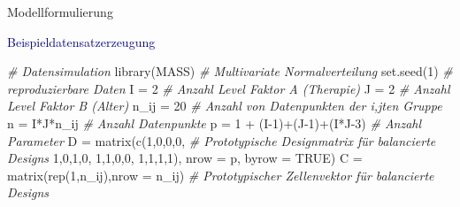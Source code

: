 \documentclass[
  8pt,
  ignorenonframetext,
]{beamer}
\newenvironment{Shaded}{\begin{snugshade}}{\end{snugshade}}
\newcommand{\AttributeTok}[1]{\textcolor[rgb]{0.77,0.63,0.00}{#1}}
\newcommand{\CommentTok}[1]{\textcolor[rgb]{0.56,0.35,0.01}{\textit{#1}}}
\newcommand{\ConstantTok}[1]{\textcolor[rgb]{0.00,0.00,0.00}{#1}}
\newcommand{\DecValTok}[1]{\textcolor[rgb]{0.00,0.00,0.81}{#1}}
\newcommand{\FunctionTok}[1]{\textcolor[rgb]{0.00,0.00,0.00}{#1}}
\newcommand{\NormalTok}[1]{#1}
\newcommand{\OtherTok}[1]{\textcolor[rgb]{0.56,0.35,0.01}{#1}}
\newcommand{\SpecialCharTok}[1]{\textcolor[rgb]{0.00,0.00,0.00}{#1}}
\begin{document}
\begin{frame}[fragile]{Modellformulierung}
\protect\hypertarget{modellformulierung-12}{}
\vspace{2mm}

\textcolor{darkblue}{Beispieldatensatzerzeugung} \vspace{1mm} \tiny
{}

\begin{Shaded}
\begin{Highlighting}[]
\CommentTok{\# Datensimulation}
\FunctionTok{library}\NormalTok{(MASS)                                            }\CommentTok{\# Multivariate Normalverteilung}
\FunctionTok{set.seed}\NormalTok{(}\DecValTok{1}\NormalTok{)                                              }\CommentTok{\# reproduzierbare Daten}
\NormalTok{I             }\OtherTok{=} \DecValTok{2}                                        \CommentTok{\# Anzahl Level Faktor A (Therapie)}
\NormalTok{J             }\OtherTok{=} \DecValTok{2}                                        \CommentTok{\# Anzahl Level Faktor B (Alter)}
\NormalTok{n\_ij          }\OtherTok{=} \DecValTok{20}                                       \CommentTok{\# Anzahl von Datenpunkten der i,jten Gruppe}
\NormalTok{n             }\OtherTok{=}\NormalTok{ I}\SpecialCharTok{*}\NormalTok{J}\SpecialCharTok{*}\NormalTok{n\_ij                                 }\CommentTok{\# Anzahl Datenpunkte}
\NormalTok{p             }\OtherTok{=} \DecValTok{1} \SpecialCharTok{+}\NormalTok{ (I}\DecValTok{{-}1}\NormalTok{)}\SpecialCharTok{+}\NormalTok{(J}\DecValTok{{-}1}\NormalTok{)}\SpecialCharTok{+}\NormalTok{(I}\SpecialCharTok{*}\NormalTok{J}\DecValTok{{-}3}\NormalTok{)                  }\CommentTok{\# Anzahl Parameter}
\NormalTok{D             }\OtherTok{=} \FunctionTok{matrix}\NormalTok{(}\FunctionTok{c}\NormalTok{(}\DecValTok{1}\NormalTok{,}\DecValTok{0}\NormalTok{,}\DecValTok{0}\NormalTok{,}\DecValTok{0}\NormalTok{,                        }\CommentTok{\# Prototypische Designmatrix für balancierte Designs}
                         \DecValTok{1}\NormalTok{,}\DecValTok{0}\NormalTok{,}\DecValTok{1}\NormalTok{,}\DecValTok{0}\NormalTok{,}
                         \DecValTok{1}\NormalTok{,}\DecValTok{1}\NormalTok{,}\DecValTok{0}\NormalTok{,}\DecValTok{0}\NormalTok{,}
                         \DecValTok{1}\NormalTok{,}\DecValTok{1}\NormalTok{,}\DecValTok{1}\NormalTok{,}\DecValTok{1}\NormalTok{),}
                \AttributeTok{nrow  =}\NormalTok{ p,}
                \AttributeTok{byrow =} \ConstantTok{TRUE}\NormalTok{)}
\NormalTok{C             }\OtherTok{=} \FunctionTok{matrix}\NormalTok{(}\FunctionTok{rep}\NormalTok{(}\DecValTok{1}\NormalTok{,n\_ij),}\AttributeTok{nrow =}\NormalTok{ n\_ij)          }\CommentTok{\# Prototypischer Zellenvektor für balancierte Designs}

\end{Highlighting}
\end{Shaded}
\end{frame}
\end{document}
